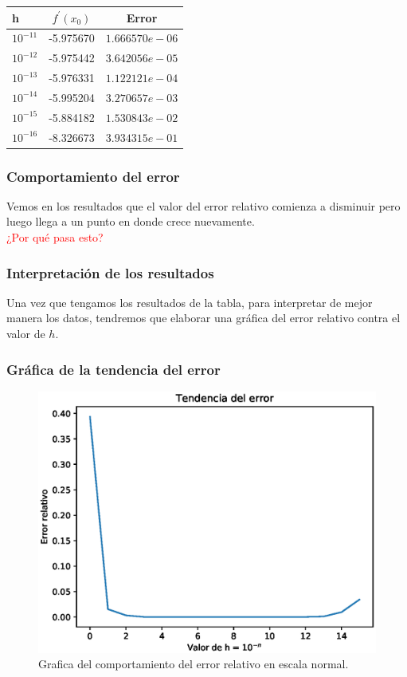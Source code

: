 \begin{frame}[fragile]
\begin{table}
\fontsize{12}{12}\selectfont
\centering
\begin{tabular}{l | p{2cm} | p{3cm}}
h & \multicolumn{1}{c}{$f^{\prime}(x_{0})$ } & \multicolumn{1}{c}{Error} \\ \hline
$10^{-11}$ & {-5.975670} & $1.666570e-06$ \\ \hline
$10^{-12}$ & {-5.975442} & $3.642056e-05$ \\ \hline
$10^{-13}$ & {-5.976331} & $1.122121e-04$ \\ \hline
$10^{-14}$ & {-5.995204} & $3.270657e-03$ \\ \hline
$10^{-15}$ & {-5.884182} & $1.530843e-02$ \\ \hline
$10^{-16}$ & {-8.326673} & $3.934315e-01$ \\ \hline
\end{tabular}
\end{table}
\end{frame}
\begin{frame}[fragile]
\frametitle{Comportamiento del error}
Vemos en los resultados que el valor del error relativo comienza a disminuir pero luego llega a un punto en donde crece nuevamente.
\\
\bigskip
\pause
\textcolor{red}{¿Por qué pasa esto?}
\end{frame}
\begin{frame}[fragile]
\frametitle{Interpretación de los resultados}
Una vez que tengamos los resultados de la tabla, para interpretar de mejor manera los datos, tendremos que elaborar una gráfica del error relativo contra el valor de $h$.
\end{frame}
\begin{frame}
\frametitle{Gráfica de la tendencia del error}
\begin{figure}
    \centering
    \includegraphics[scale=0.55]{Imagenes/Ejercicio_Derivada_00.eps}
    \caption{Grafica del comportamiento del error relativo en escala normal.}
\end{figure}
\end{frame}
